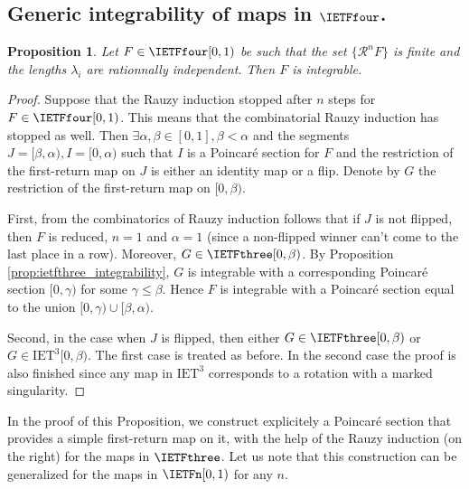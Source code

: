 \documentclass[12pt]{article}
\newtheorem{proposition}{Proposition}
\theoremstyle{definition}
\begin{document}
\subsection{Generic integrability of maps in $\IETFfour$.}


\begin{proposition}\label{prop:just_before}
Let $F \in \IETFfour[0,1)$ be such that the set $\{{\mathcal{R}}^n F\}$ is finite and the lengths $\lambda_i$ are rationnally independent. Then $F$ is integrable. 
\end{proposition} 
\begin{proof}

Suppose that the Rauzy induction stopped after $n$ steps for $F \in \IETFfour[0,1)$. This means that the combinatorial Rauzy induction has stopped as well. Then $\exists \alpha, \beta \in [0,1], \beta<\alpha$ and the segments $J=[\beta, \alpha), I=[0, \alpha)$ such that $I$ is a Poincaré section for $F$ and the restriction of the first-return map on $J$ is either an identity map or a flip. Denote by $G$ the restriction of the first-return map on $[0, \beta)$.

First, from the combinatorics of Rauzy induction follows that if $J$ is not flipped, then $F$ is reduced, $n=1$ and $\alpha=1$ (since a non-flipped winner can't come to the last place in a row). Moreover, $G \in \IETFthree [0,\beta)$. By Proposition \ref{prop:ietfthree_integrability}, $G$ is integrable with a corresponding Poincaré section $[0, \gamma)$ for some $\gamma\leq\beta$. Hence $F$ is integrable with a Poincaré section equal to the union $[0, \gamma) \cup [\beta, \alpha)$.
 
Second, in the case when $J$ is flipped, then either $ G \in \IETFthree[0,\beta)$ or $G \in \mathrm{IET}^3[0,\beta)$. The first case is treated as before. In the second case the proof is also finished since any map in $ \mathrm{IET}^3$ corresponds to a rotation with a marked singularity.
\end{proof} 

In the proof of this Proposition, we construct explicitely a Poincaré section that provides a simple first-return map on it, with the help of the Rauzy induction (on the right) for the maps in $\IETFthree$. Let us note that this construction can be generalized for the maps in $ \IETFn[0,1)$ for any $n$.
\end{document}
